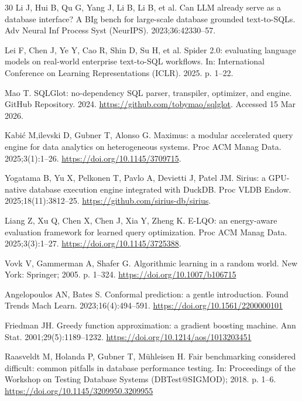 \documentclass[10pt,a4paper]{article}
\begin{document}
{\begin{thebibliography}{30}
Li J, Hui B, Qu G, Yang J, Li B, Li B, et al. Can LLM already serve as a database interface? A BIg bench for large-scale database grounded text-to-SQLs. Adv Neural Inf Process Syst (NeurIPS). 2023;36:42330--57.

Lei F, Chen J, Ye Y, Cao R, Shin D, Su H, et al. Spider 2.0: evaluating language models on real-world enterprise text-to-SQL workflows. In: International Conference on Learning Representations (ICLR). 2025. p. 1--22.

Mao T. SQLGlot: no-dependency SQL parser, transpiler, optimizer, and engine. GitHub Repository. 2024. \url{https://github.com/tobymao/sqlglot}. Accessed 15 Mar 2026.

Kabi\'{c} M,ilevski D, Gubner T, Alonso G. Maximus: a modular accelerated query engine for data analytics on heterogeneous systems. Proc ACM Manag Data. 2025;3(1):1--26. \url{https://doi.org/10.1145/3709715}.

Yogatama B, Yu X, Pelkonen T, Pavlo A, Devietti J, Patel JM. Sirius: a GPU-native database execution engine integrated with DuckDB. Proc VLDB Endow. 2025;18(11):3812--25. \url{https://github.com/sirius-db/sirius}.

Liang Z, Xu Q, Chen X, Chen J, Xia Y, Zheng K. E-LQO: an energy-aware evaluation framework for learned query optimization. Proc ACM Manag Data. 2025;3(3):1--27. \url{https://doi.org/10.1145/3725388}.

Vovk V, Gammerman A, Shafer G. Algorithmic learning in a random world. New York: Springer; 2005. p. 1--324. \url{https://doi.org/10.1007/b106715}

Angelopoulos AN, Bates S. Conformal prediction: a gentle introduction. Found Trends Mach Learn. 2023;16(4):494--591. \url{https://doi.org/10.1561/2200000101}

Friedman JH. Greedy function approximation: a gradient boosting machine. Ann Stat. 2001;29(5):1189--1232. \url{https://doi.org/10.1214/aos/1013203451}

Raasveldt M, Holanda P, Gubner T, M{\"u}hleisen H. Fair benchmarking considered difficult: common pitfalls in database performance testing. In: Proceedings of the Workshop on Testing Database Systems (DBTest@SIGMOD); 2018. p. 1--6. \url{https://doi.org/10.1145/3209950.3209955}


\end{thebibliography}}
\end{document}

